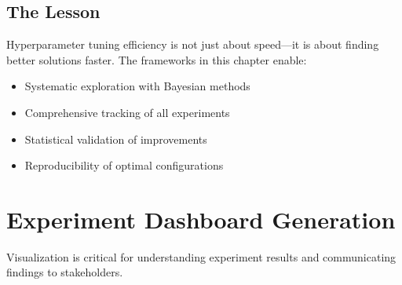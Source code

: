 \subsection{The Lesson}

Hyperparameter tuning efficiency is not just about speed---it is about finding better solutions faster. The frameworks in this chapter enable:

\begin{itemize}
    \item Systematic exploration with Bayesian methods
    \item Comprehensive tracking of all experiments
    \item Statistical validation of improvements
    \item Reproducibility of optimal configurations
\end{itemize}

\section{Experiment Dashboard Generation}

Visualization is critical for understanding experiment results and communicating findings to stakeholders.

